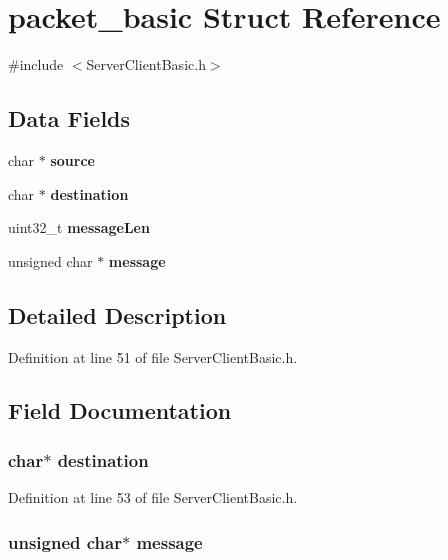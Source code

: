 \section{packet\+\_\+basic Struct Reference}
\label{structpacket__basic}


{\ttfamily \#include $<$Server\+Client\+Basic.\+h$>$}

\subsection*{Data Fields}
\begin{DoxyCompactItemize}
\item 
char $\ast$ {\bf source}
\item 
char $\ast$ {\bf destination}
\item 
uint32\+\_\+t {\bf message\+Len}
\item 
unsigned char $\ast$ {\bf message}
\end{DoxyCompactItemize}


\subsection{Detailed Description}


Definition at line 51 of file Server\+Client\+Basic.\+h.



\subsection{Field Documentation}
\subsubsection[{destination}]{\setlength{\rightskip}{0pt plus 5cm}char$\ast$ destination}\label{structpacket__basic_ae98a0878a8abb793b89317d904f8c00a}


Definition at line 53 of file Server\+Client\+Basic.\+h.

\subsubsection[{message}]{\setlength{\rightskip}{0pt plus 5cm}unsigned char$\ast$ message}\label{structpacket__basic_abb13456032cf48eaa794391b6ed937c7}


